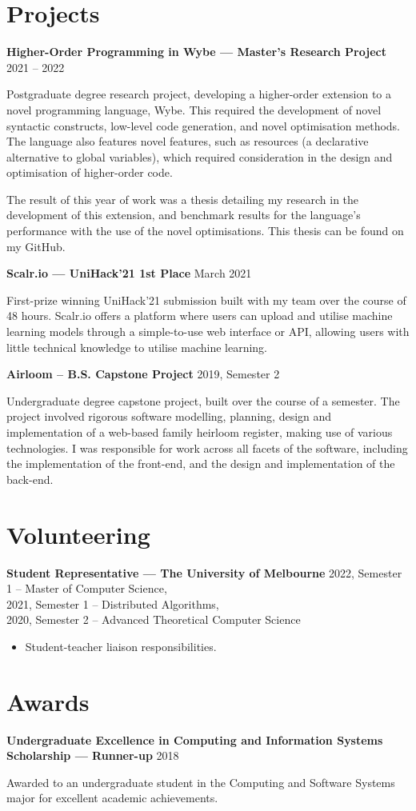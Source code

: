 \documentclass[9pt]{extarticle}
\newcommand{\entry}[3]{
    \textbf{#1} \newline
    {\footnotesize #2}
    \vspace{.05em}
    \begin{flushleft}
        #3
    \end{flushleft}
}
\begin{document}
\pagebreak

\section{Projects}

\entry{Higher-Order Programming in Wybe --- Master's Research Project}
{2021 -- 2022}
{
    Postgraduate degree research project, developing a higher-order extension to a novel programming language, Wybe.
    This required the development of novel syntactic constructs, low-level code generation, and novel optimisation methods.
    The language also features novel features, such as resources (a declarative alternative to global variables), which 
    required consideration in the design and optimisation of higher-order code.

    The result of this year of work was a thesis detailing my research in the development of this extension, and 
    benchmark results for the language's performance with the use of the novel optimisations. This thesis can be found on my GitHub.
}
\vspace{1.5em}

\entry{Scalr.io --- UniHack'21 1st Place}
{March 2021}
{
    First-prize winning UniHack'21 submission built with my team over the course of 48 hours. 
    Scalr.io offers a platform where users can upload and utilise machine learning models through a simple-to-use web interface or API,
    allowing users with little technical knowledge to utilise machine learning. 
}
\vspace{1.5em}

\entry{Airloom -- B.S. Capstone Project}
{2019, Semester 2}
{
    Undergraduate degree capstone project, built over the course of a semester. The project involved rigorous software modelling,
    planning, design and implementation of a web-based family heirloom register, making use of various technologies.
    I was responsible for work across all facets of the software, including the implementation of the front-end, 
    and the design and implementation of the back-end.
}
\vspace{1.5em}

\medskip

\section{Volunteering}

\entry{Student Representative --- The University of Melbourne}
{
    2022, Semester 1 -- Master of Computer Science, \\
    2021, Semester 1 -- Distributed Algorithms, \\
    2020, Semester 2 -- Advanced Theoretical Computer Science
}
{
    \begin{itemize}
        \item Student-teacher liaison responsibilities.
    \end{itemize}
}

\medskip

\section{Awards}

\entry{Undergraduate Excellence in Computing and Information Systems Scholarship --- Runner-up}
{2018} 
{
    Awarded to an undergraduate student in the Computing and Software Systems major for excellent academic achievements.
}
\end{document}
